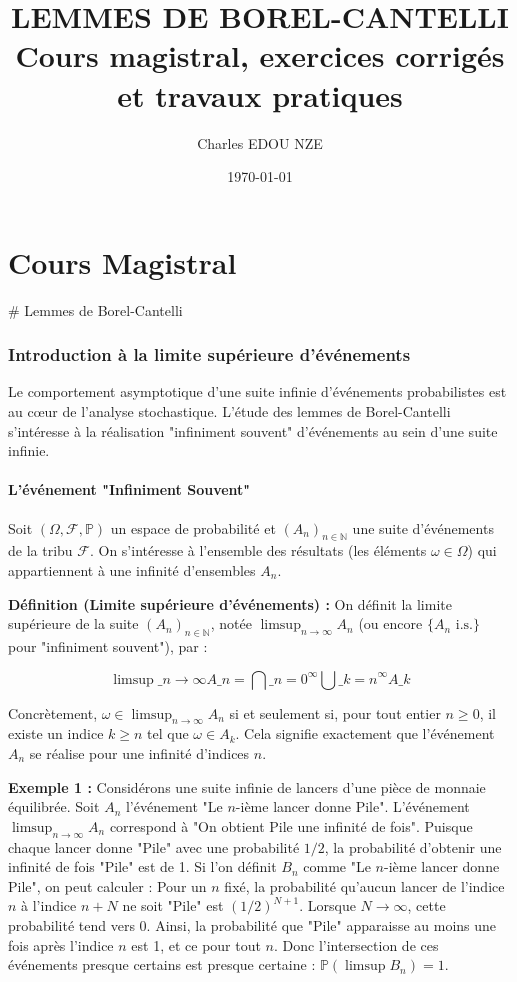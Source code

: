 \documentclass[11pt,a4paper]{article}
\title{\Huge LEMMES DE BOREL-CANTELLI \\ \large Cours magistral, exercices corrigés et travaux pratiques}
\author{\Large Charles EDOU NZE}
\date{\today}
\begin{document}
\maketitle
\tableofcontents
\newpage

\part{Cours Magistral}

\# Lemmes de Borel-Cantelli

\section{Introduction à la limite supérieure d'événements}

Le comportement asymptotique d'une suite infinie d'événements probabilistes est au cœur de l'analyse stochastique. L'étude des lemmes de Borel-Cantelli s'intéresse à la réalisation "infiniment souvent" d'événements au sein d'une suite infinie.

\subsection{L'événement "Infiniment Souvent"}

Soit $(\Omega, \mathcal{F}, \mathbb{P})$ un espace de probabilité et $(A_n)_{n \in \mathbb{N}}$ une suite d'événements de la tribu $\mathcal{F}$. On s'intéresse à l'ensemble des résultats (les éléments $\omega \in \Omega$) qui appartiennent à une infinité d'ensembles $A_n$.

\textbf{Définition (Limite supérieure d'événements) :}
On définit la limite supérieure de la suite $(A_n)_{n \in \mathbb{N}}$, notée $\limsup_{n \to \infty} A_n$ (ou encore $\{A_n \text{ i.s.}\}$ pour "infiniment souvent"), par :

$$ \limsup\_{n \to \infty} A\_n = \bigcap\_{n=0}^\infty \bigcup\_{k=n}^\infty A\_k $$

Concrètement, $\omega \in \limsup_{n \to \infty} A_n$ si et seulement si, pour tout entier $n \ge 0$, il existe un indice $k \ge n$ tel que $\omega \in A_k$. Cela signifie exactement que l'événement $A_n$ se réalise pour une infinité d'indices $n$.

\textbf{Exemple 1 :}
Considérons une suite infinie de lancers d'une pièce de monnaie équilibrée. Soit $A_n$ l'événement "Le $n$-ième lancer donne Pile". L'événement $\limsup_{n \to \infty} A_n$ correspond à "On obtient Pile une infinité de fois". Puisque chaque lancer donne "Pile" avec une probabilité $1/2$, la probabilité d'obtenir une infinité de fois "Pile" est de 1.
Si l'on définit $B_n$ comme "Le $n$-ième lancer donne Pile", on peut calculer :
Pour un $n$ fixé, la probabilité qu'aucun lancer de l'indice $n$ à l'indice $n+N$ ne soit "Pile" est $(1/2)^{N+1}$.
Lorsque $N \to \infty$, cette probabilité tend vers 0. Ainsi, la probabilité que "Pile" apparaisse au moins une fois après l'indice $n$ est 1, et ce pour tout $n$. Donc l'intersection de ces événements presque certains est presque certaine : $\mathbb{P}(\limsup B_n) = 1$.
\end{document}
